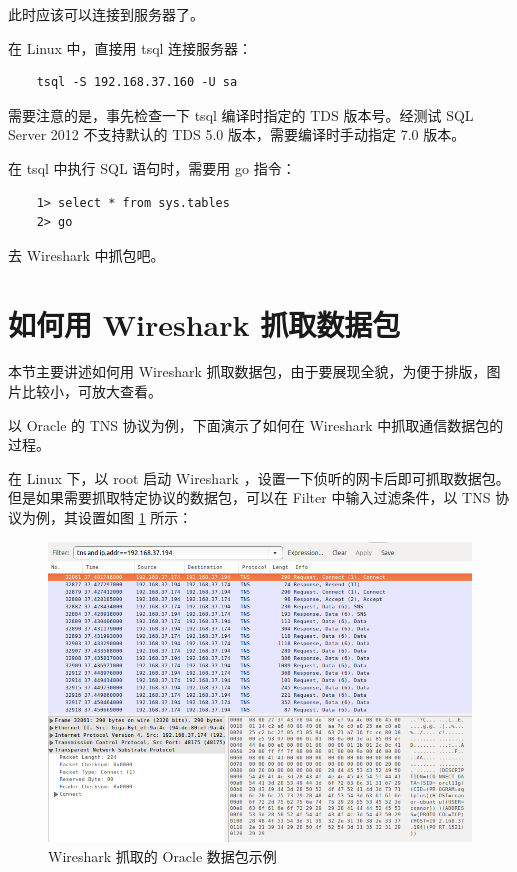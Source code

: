 此时应该可以连接到服务器了。

在 Linux 中，直接用 {\cmdf tsql} 连接服务器：

\begin{lstlisting}
    tsql -S 192.168.37.160 -U sa
\end{lstlisting}

需要注意的是，事先检查一下 {\cmdf tsql} 编译时指定的 TDS 版本号。经测试 SQL Server 2012 不支持默认的 TDS 5.0 版本，需要编译时手动指定 7.0 版本。

在 {\cmdf tsql} 中执行 SQL 语句时，需要用 {\cf go} 指令：

\begin{lstlisting}
    1> select * from sys.tables
    2> go
\end{lstlisting}

去 Wireshark 中抓包吧。

\section{如何用 Wireshark 抓取数据包}
本节主要讲述如何用 Wireshark 抓取数据包，由于要展现全貌，为便于排版，图片比较小，可放大查看。

以 Oracle 的 TNS 协议为例，下面演示了如何在 Wireshark 中抓取通信数据包的过程。

在 Linux 下，以 root 启动 Wireshark ，设置一下侦听的网卡后即可抓取数据包。但是如果需要抓取特定协议的数据包，可以在 {\ef Filter} 中输入过滤条件，以 TNS 协议为例，其设置如图 \ref{fig:wireshark-tns} 所示：

\begin{figure}[ht!]
    \caption{Wireshark 抓取的 Oracle 数据包示例}
    \label{fig:wireshark-tns}
    \centering
    \includegraphics[width=\textwidth]{wireshark-tns.png}
\end{figure}

